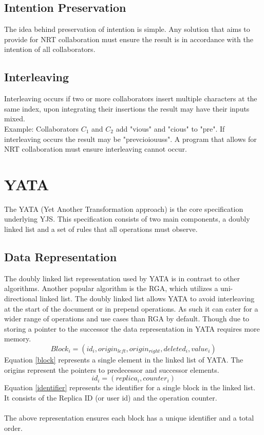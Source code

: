 \documentclass[12pt]{article}
\begin{document}
  \subsection{Intention Preservation}
  The idea behind preservation of intention is simple. Any solution that aims to provide for NRT collaboration must ensure the result is in accordance with the intention of all collaborators.

  \subsection{Interleaving}
  Interleaving occurs if two or more collaborators insert multiple characters at the same index, upon integrating their insertions the result may have their inputs mixed.\\
  Example: Collaborators \(C_{1}\) and \(C_{2}\) add "vious" and "cious" to "pre". If interleaving occurs the result may be "prevcioiouuss".
  A program that allows for NRT collaboration must ensure interleaving cannot occur.

  \section{YATA}
  The YATA (Yet Another Transformation approach) is the core specification underlying YJS.
  This specification consists of two main components, a doubly linked list and a set of rules that all operations must observe.
  
  \subsection{Data Representation}
  The doubly linked list representation used by YATA is in contrast to other algorithms. Another popular algorithm is the RGA, which utilizes a uni-directional linked list.
  The doubly linked list allows YATA to avoid interleaving at the start of the document or in prepend operations.
  As such it can cater for a wider range of operations and use cases than RGA by default. Though due to storing a pointer to the successor the data representation in YATA requires more memory.
  \begin{equation} \label{block}
    Block_{i} = (id_{i}, origin_{left}, origin_{right}, deleted_{i}, value_{i})
  \end{equation}
  Equation \ref{block} represents a single element in the linked list of YATA. The origins represent the pointers to predecessor and successor elements.
  \begin{equation} \label{identifier}
    id_{i} = (replica_{i}, counter_{i})
  \end{equation}
  Equation \ref{identifier} represents the identifier for a single block in the linked list. It consists of the Replica ID (or user id) and the operation counter.\\\\
  The above representation ensures each block has a unique identifier and a total order. 
  
\end{document}
